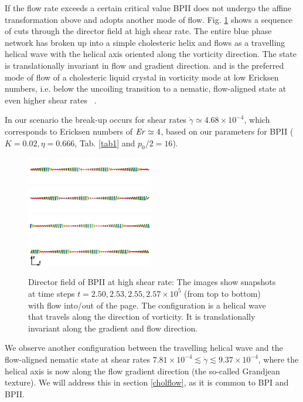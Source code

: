 \documentclass[aps,pre,reprint,superscriptaddress, twocolumn]{revtex4}
\newcommand{\e}[1]{\times10^{#1}}
\newcommand{\gd}{\dot{\gamma}}
\begin{document}
If the flow rate exceeds a certain critical value BPII does not undergo the 
affine transformation  above and adopts another mode of flow. 
Fig. \ref{bp2-high} shows a sequence of cuts through the director 
field at high shear rate. The entire blue phase network has broken up 
into a simple cholesteric helix and flows as a travelling 
helical wave with the helical axis oriented along the vorticity direction.
The state is translationally invariant in flow and gradient direction.
and is the preferred mode of flow of a cholesteric 
liquid crystal in vorticity mode at low Ericksen numbers, i.e. below 
the uncoiling transition to a nematic, flow-aligned state at even 
higher shear rates ~\cite{Rey:1996a, Rey:1996b}.

In our scenario the break-up occurs for shear rates $\gd\simeq 4.68\e{-4}$, which
corresponds to Ericksen numbers of ${\it Er}\simeq4$, based on our
parameters for BPII ($K=0.02, \eta=0.666$, Tab. \ref{tab1} and $p_0/2=16$).

\begin{figure}[htpb]
\includegraphics[width=0.495\textwidth]{dir+y-250k_run949.png}
\includegraphics[width=0.495\textwidth]{dir+y-253k_run949.png}
\includegraphics[width=0.495\textwidth]{dir+y-255k_run949.png}
\includegraphics[width=0.495\textwidth]{dir+y-257k_run949.png}
\caption{Director field of BPII at high shear rate: The images show snapshots at time steps 
$t=2.50, 2.53,2.55, 2.57\e{5}$ (from top to bottom) with flow into/out of the page. 
The configuration is a helical wave that travels along the direction of vorticity.
It is translationally invariant along the gradient and flow direction.}
\label{bp2-high}
\end{figure}

We observe another configuration between the travelling helical wave and the 
flow-aligned nematic state at shear rates $7.81\e{-4}\lesssim\gd\lesssim9.37\e{-4}$, 
where the helical axis is now along the flow gradient direction (the so-called
Grandjean texture).
We will address this in section \ref{cholflow}, as it is common to BPI and BPII.
\end{document}
